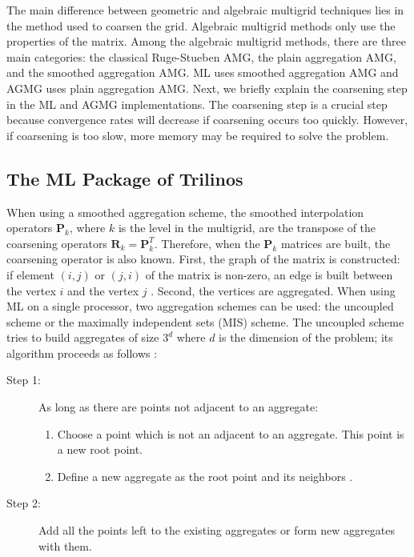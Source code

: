 \documentclass[preprint,10pt]{elsarticle}
\newcommand\bs{\boldsymbol}
\renewcommand{\(}{\left(}
\renewcommand{\)}{\right)}
\renewcommand{\[}{\left[}
\renewcommand{\]}{\right]}
\begin{document}
The main difference between geometric and algebraic multigrid techniques
lies in the method used
to coarsen the grid. Algebraic multigrid methods only use the properties of the
matrix. Among the algebraic multigrid methods, there are three main categories: 
the classical Ruge-Stueben AMG, the plain aggregation AMG, and the
smoothed aggregation AMG. ML uses smoothed aggregation AMG and AGMG
uses plain aggregation AMG. Next, we briefly explain the coarsening step in
the ML and AGMG implementations. The coarsening step is a crucial step 
because convergence rates will decrease if coarsening occurs too quickly. 
However, if coarsening is too slow, more memory may be required to solve the problem. 

\subsection{The ML Package of Trilinos}
When using a smoothed aggregation scheme, the smoothed interpolation operators
$\bs{P}_k$, where $k$ is the level in the multigrid, are the transpose of the coarsening operators
$\bs{R}_k=\bs{P}_k^T$. Therefore, when the $\bs{P}_k$ matrices are built, the
coarsening operator is also known. First, the graph of the matrix is
constructed: if element $(i,j)$ or $(j,i)$ of the matrix is non-zero, an edge
is built between the vertex $i$ and the vertex $j$ \cite{ml_guide}. Second,
the vertices are 
aggregated. When using ML on a single processor, two aggregation schemes can
be used: the uncoupled scheme or the maximally independent sets (MIS) scheme. 
The uncoupled scheme tries to build aggregates of size $3^d$ where $d$ is the
dimension of the problem; its algorithm proceeds as follows \cite{mis}:
\begin{description}
  \item[Step 1:] As long as there are points not adjacent to an aggregate:
    \begin{enumerate}
      \item Choose a point which is not an adjacent to an
        aggregate. This point is a new root point.
      \item Define a new aggregate as the root point and its neighbors .
    \end{enumerate}
  \item[Step 2:] Add all the points left to the existing aggregates or form 
    new aggregates with them.
\end{description}
\end{document}
